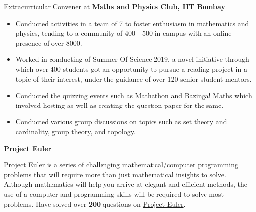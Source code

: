 
\begin{rubric}{Extracurricular}
\entry*[] Convener at \textbf{Maths and Physics Club, IIT Bombay}
\vspace{-2mm}
\begin{itemize}%
	\setlength\itemsep{-0.4em}
    \item Conducted activities in a team of 7 to foster enthusiasm in mathematics and physics, tending to a community of 400 - 500 in campus with an online presence of over 8000.
    \item Worked in conducting of Summer Of Science 2019, a novel initiative through which over 400 students got an opportunity to pursue a reading project in a topic of their interest, under the guidance of over 120 senior student mentors.
    \item Conducted the quizzing events such as Mathathon and Bazinga! Maths which involved hosting as well as creating the question paper for the same. 
    \item Conducted various group discussions on topics such as set theory and cardinality, group theory, and topology. \vspace{-5mm}
\end{itemize}
%


%
\entry*[] \textbf{Project Euler}

Project Euler is a series of challenging mathematical/computer programming problems that will require more than just mathematical insights to solve. Although mathematics will help you arrive at elegant and efficient methods, the use of a computer and programming skills will be required to solve most problems. Have solved over \textbf{200} questions on \href{https://projecteuler.net/}{Project Euler}.
\end{rubric}